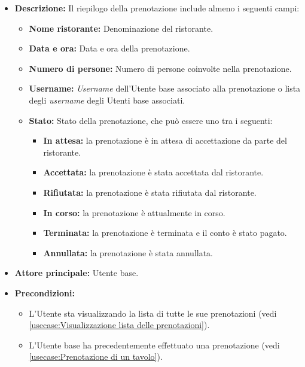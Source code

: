 \label{usecase:Visualizzazione del riepilogo prenotazione}
\begin{itemize}
	\item \textbf{Descrizione:}
	Il riepilogo della prenotazione include almeno i seguenti campi:
	\begin{itemize}
		\item \textbf{Nome ristorante:} Denominazione del ristorante.
		\item \textbf{Data e ora:} Data e ora della prenotazione.
		\item \textbf{Numero di persone:} Numero di persone coinvolte nella prenotazione.
		\item \textbf{Username:} \textit{Username} dell'Utente base associato alla prenotazione o lista degli \textit{username} degli Utenti base associati.

		\item \textbf{Stato:} Stato della prenotazione, che può essere uno tra i seguenti:
			  \begin{itemize}
				  \item \textbf{In attesa:} la prenotazione è in attesa di accettazione da parte del ristorante.
				  \item \textbf{Accettata:} la prenotazione è stata accettata dal ristorante.
				  \item \textbf{Rifiutata:} la prenotazione è stata rifiutata dal ristorante.
				  \item \textbf{In corso:} la prenotazione è attualmente in corso.
				  \item \textbf{Terminata:} la prenotazione è terminata e il conto è stato pagato.
				  \item \textbf{Annullata:} la prenotazione è stata annullata.
			  \end{itemize}
	\end{itemize}
	
	\item \textbf{Attore principale:} Utente base.

	\item \textbf{Precondizioni:}
	      \begin{itemize}
		      \item L'Utente sta visualizzando la lista di tutte le sue prenotazioni (vedi \autoref{usecase:Visualizzazione lista delle prenotazioni}).
		      \item L'Utente base ha precedentemente effettuato una prenotazione (vedi \autoref{usecase:Prenotazione di un tavolo}).
	      \end{itemize}



\end{itemize}
